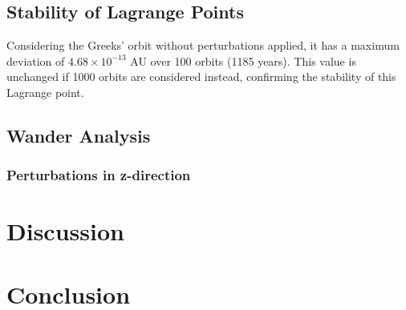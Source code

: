 \documentclass[11pt, a4paper,twocolumn]{article} %
\begin{document}
\subsection{Stability of Lagrange Points}
Considering the Greeks' orbit without perturbations applied, it has a maximum deviation of $4.68 \times 10^{-13}$ AU over 100 orbits (1185 years). This value is unchanged if 1000 orbits are considered instead, confirming the stability of this Lagrange point.



\subsection{Wander Analysis}
\subsubsection{Perturbations in z-direction}

\section{Discussion}
\section{Conclusion}



\printbibliography
\end{document}

